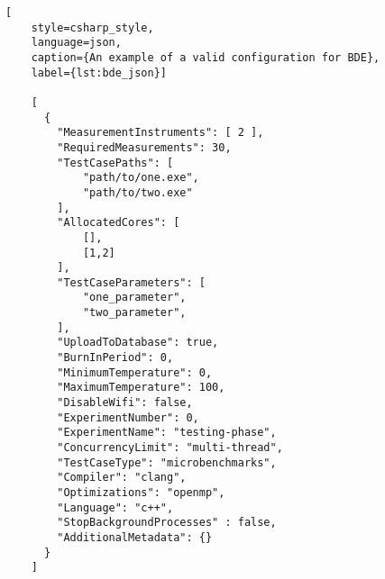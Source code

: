 
\begin{lstlisting}[
    style=csharp_style,
    language=json, 
    caption={An example of a valid configuration for BDE},
    label={lst:bde_json}]
    
    [
      {
        "MeasurementInstruments": [ 2 ],
        "RequiredMeasurements": 30,
        "TestCasePaths": [
            "path/to/one.exe",
            "path/to/two.exe" 
        ],
        "AllocatedCores": [
            [],
            [1,2]
        ],
        "TestCaseParameters": [ 
            "one_parameter",
            "two_parameter",
        ],
        "UploadToDatabase": true,
        "BurnInPeriod": 0,
        "MinimumTemperature": 0,
        "MaximumTemperature": 100,
        "DisableWifi": false,
        "ExperimentNumber": 0,
        "ExperimentName": "testing-phase",
        "ConcurrencyLimit": "multi-thread",
        "TestCaseType": "microbenchmarks",
        "Compiler": "clang",
        "Optimizations": "openmp",
        "Language": "c++",
        "StopBackgroundProcesses" : false,
        "AdditionalMetadata": {}
      }
    ]

\end{lstlisting}